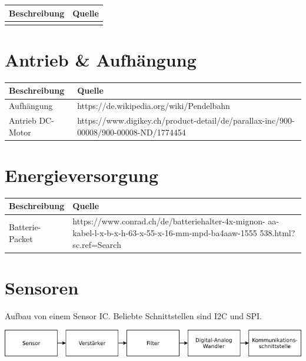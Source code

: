 \documentclass[a4paper]{report}
\begin{document}
\vspace{1em}
\noindent
\begin{tabular}{|l|l|}
	\hline 
	\textbf{Beschreibung} & \textbf{Quelle} \\
	\hline
	 &  \\
	\hline
\end{tabular}

\section{Antrieb \& Aufhängung}

\vspace{1em}
\noindent
\begin{tabular}{|l|l|}
	\hline 
	\textbf{Beschreibung} & \textbf{Quelle} \\
	\hline
	Aufhängung & https://de.wikipedia.org/wiki/Pendelbahn  \\
	\hline
	Antrieb DC-Motor & https://www.digikey.ch/product-detail/de/parallax-inc/900-00008/900-00008-ND/1774454 \\
	\hline
\end{tabular}

\section{Energieversorgung}


\vspace{1em}
\noindent
\begin{tabular}{|p{}|p{}|}
	\hline
	\textbf{Beschreibung} & \textbf{Quelle} \\
	\hline
	Batterie-Packet & https://www.conrad.ch/de/batteriehalter-4x-mignon-
	aa-kabel-l-x-b-x-h-63-x-55-x-16-mm-mpd-ba4aaw-1555
	538.html?sc.ref=Search%
	\\
	\hline
\end{tabular}


\vspace{1em}
\noindent

\section{Sensoren}
Aufbau von einem Sensor IC. Beliebte Schnittstellen sind I2C und SPI.

\includegraphics[width=\textwidth,keepaspectratio]{daq}
\end{document}
